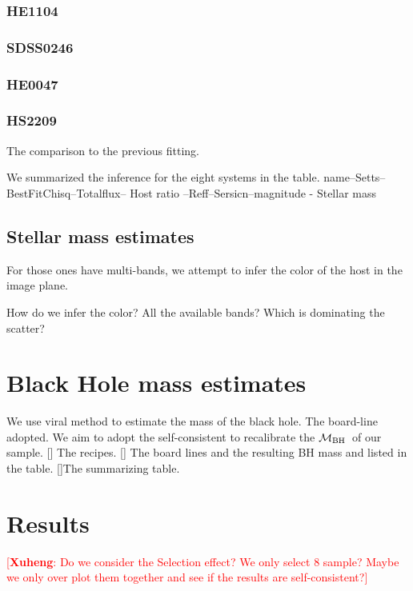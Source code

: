 \documentclass[fleqn,usenatbib]{mnras}
\newcommand{\mbh}{$\mathcal M_{\rm BH}$}
\newcommand{\ding}[1]{\textcolor{red}{[{\bf Xuheng}: #1]}}
\begin{document}
\subsubsection{HE1104}

\subsubsection{SDSS0246}

\subsubsection{HE0047}

\subsubsection{HS2209}

The comparison to the previous fitting.

We summarized the inference for the eight systems in the table.
name--Setts--BestFitChisq--Totalflux-- Host ratio --Reff--Sersicn--magnitude - Stellar mass

\subsection{Stellar mass estimates}
For those ones have multi-bands, we attempt to infer the color of the host in the image plane.

How do we infer the color? All the available bands? Which is dominating the scatter?

\section{Black Hole mass estimates}
We use viral method to estimate the mass of the black hole. The board-line adopted. We aim to adopt the self-consistent to recalibrate the \mbh~of our sample. 
[] The recipes. [] The board lines and the resulting BH mass and listed in the table. []The summarizing table.

\section{Results}


\ding{Do we consider the Selection effect? We only select 8 sample? Maybe we only over plot them together and see if the results are self-consistent?}
\end{document}

